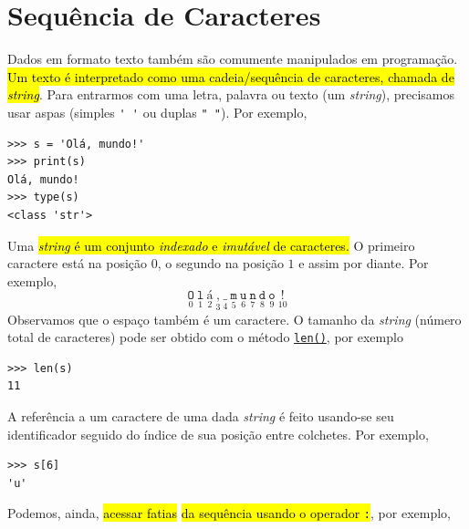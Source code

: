 \section{Sequência de Caracteres}\label{cap_lingua_sec_string}

Dados em formato texto também são comumente manipulados em programação. \hl{Um texto é interpretado como uma cadeia/sequência de caracteres, chamada de \emph{\textit{string}}}. Para entrarmos com uma letra, palavra ou texto (um \textit{string}), precisamos usar aspas (simples \lstinline+' '+ ou duplas \lstinline+" "+). Por exemplo,

\begin{lstlisting}
>>> s = 'Olá, mundo!'
>>> print(s)
Olá, mundo!
>>> type(s)
<class 'str'>
\end{lstlisting}

Uma \hl{\textit{string} é um conjunto \emph{indexado} e \emph{imutável} de caracteres.} O primeiro caractere está na posição $0$, o segundo na posição $1$ e assim por diante. Por exemplo,
\begin{equation}
  \underset{0}{\texttt{O}}~\underset{1}{\texttt{l}}~\underset{2}{\texttt{á}}~\underset{3}{\texttt{,}}~\underset{4}{\texttt{\_}}~\underset{5}{\texttt{m}}~\underset{6}{\texttt{u}}~\underset{7}{\texttt{n}}~\underset{8}{\texttt{d}}~\underset{9}{\texttt{o}}~\underset{10}{\texttt{!}}
\end{equation}
Observamos que o espaço também é um caractere. O tamanho da \textit{string} (número total de caracteres) pode ser obtido com o método \href{https://docs.python.org/3/library/functions.html\#len}{\lstinline+len()+}, por exemplo

\begin{lstlisting}
>>> len(s)
11
\end{lstlisting}

A referência a um caractere de uma dada \textit{string} é feito usando-se seu identificador seguido do índice de sua posição entre colchetes. Por exemplo,

\begin{lstlisting}
>>> s[6]
'u'
\end{lstlisting}

Podemos, ainda, \hl{acessar fatias}\hl{ da sequência usando o operador \texttt{:}}, por exemplo,

